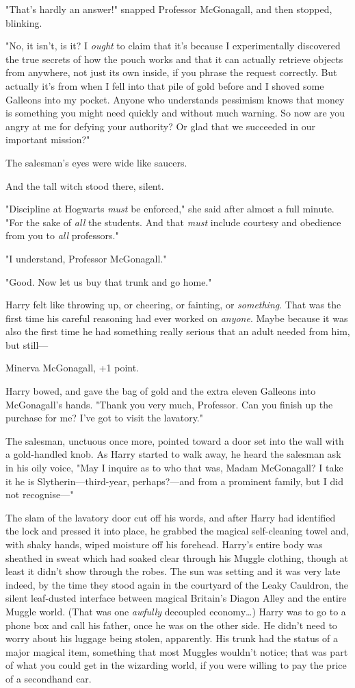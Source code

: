 "That's hardly an answer!" snapped Professor McGonagall, and then stopped,
blinking.

"No, it isn't, is it? I \emph{ought} to claim that it's because I
experimentally discovered the true secrets of how the pouch works and that it
can actually retrieve objects from anywhere, not just its own inside, if you
phrase the request correctly. But actually it's from when I fell into that pile
of gold before and I shoved some Galleons into my pocket. Anyone who
understands pessimism knows that money is something you might need quickly and
without much warning. So now are you angry at me for defying your authority? Or
glad that we succeeded in our important mission?"

The salesman's eyes were wide like saucers.

And the tall witch stood there, silent.

"Discipline at Hogwarts \emph{must} be enforced," she said after almost a full
minute. "For the sake of \emph{all} the students. And that \emph{must} include
courtesy and obedience from you to \emph{all} professors."

"I understand, Professor McGonagall."

"Good. Now let us buy that trunk and go home."

Harry felt like throwing up, or cheering, or fainting, or \emph{something}.
That was the first time his careful reasoning had ever worked on \emph{anyone}.
Maybe because it was also the first time he had something really serious that
an adult needed from him, but still---

Minerva McGonagall, +1 point.

Harry bowed, and gave the bag of gold and the extra eleven Galleons into
McGonagall's hands. "Thank you very much, Professor. Can you finish up the
purchase for me? I've got to visit the lavatory."

The salesman, unctuous once more, pointed toward a door set into the wall with
a gold-handled knob. As Harry started to walk away, he heard the salesman ask
in his oily voice, "May I inquire as to who that was, Madam McGonagall? I take
it he is Slytherin---third-year, perhaps?---and from a prominent family, but I
did not recognise---"

The slam of the lavatory door cut off his words, and after Harry had identified
the lock and pressed it into place, he grabbed the magical self-cleaning towel
and, with shaky hands, wiped moisture off his forehead. Harry's entire body was
sheathed in sweat which had soaked clear through his Muggle clothing, though at
least it didn't show through the robes.
\later
The sun was setting and it was very late indeed, by the time they stood again
in the courtyard of the Leaky Cauldron, the silent leaf-dusted interface
between magical Britain's Diagon Alley and the entire Muggle world. (That was
one \emph{awfully} decoupled economy{\ldots}) Harry was to go to a phone box
and call his father, once he was on the other side. He didn't need to worry
about his luggage being stolen, apparently. His trunk had the status of a major
magical item, something that most Muggles wouldn't notice; that was part of
what you could get in the wizarding world, if you were willing to pay the price
of a secondhand car.


